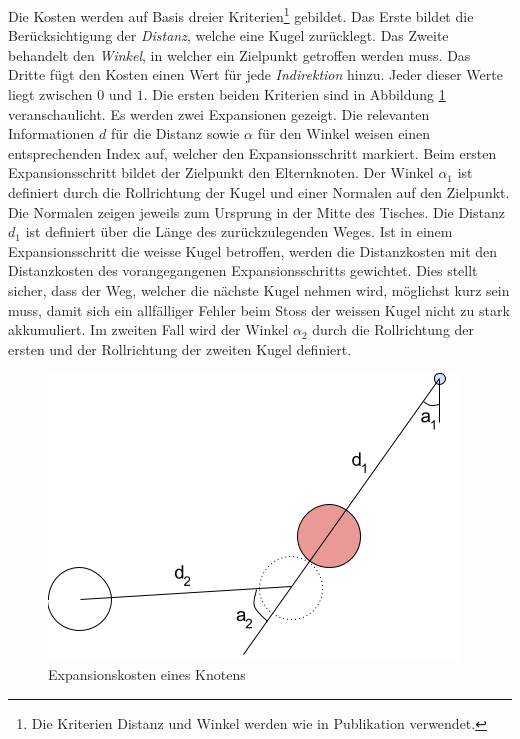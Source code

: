 Die Kosten werden auf Basis dreier Kriterien\footnote{Die Kriterien Distanz und Winkel werden wie
in Publikation \cite{inproceedings:billiard_ai:1} verwendet.} gebildet. Das Erste bildet die Berücksichtigung der \emph{Distanz}, welche eine
Kugel zurücklegt. Das Zweite behandelt den \emph{Winkel}, in welcher ein Zielpunkt getroffen werden muss. Das Dritte fügt den
Kosten einen Wert für jede \emph{Indirektion} hinzu. Jeder dieser Werte liegt zwischen $0$ und $1$.
Die ersten beiden Kriterien sind in Abbildung \ref{fig:suche_knoten_expansionskosten} veranschaulicht.
Es werden zwei Expansionen gezeigt. Die relevanten Informationen $d$ für die Distanz sowie $\alpha$ für den Winkel weisen
einen entsprechenden Index auf, welcher den Expansionsschritt markiert. Beim ersten Expansionsschritt bildet der Zielpunkt
den Elternknoten. Der Winkel $\alpha_1$ ist definiert durch die Rollrichtung der Kugel und einer Normalen auf den Zielpunkt.
Die Normalen zeigen jeweils zum Ursprung in der Mitte des Tisches. Die Distanz $d_1$ ist definiert über die Länge des
zurückzulegenden Weges. Ist in einem Expansionsschritt die weisse Kugel betroffen, werden die Distanzkosten mit den
Distanzkosten des vorangegangenen Expansionsschritts gewichtet. Dies stellt sicher, dass der Weg, welcher die nächste
Kugel nehmen wird, möglichst kurz sein muss, damit sich ein allfälliger Fehler beim Stoss der weissen Kugel nicht zu
stark akkumuliert. Im zweiten Fall wird der Winkel $\alpha_2$ durch die Rollrichtung der ersten und der Rollrichtung
der zweiten Kugel definiert.

\begin{figure}[h!]
    \begin{center}
        \includegraphics[width=0.4\linewidth]{../common/03_billiard_ai/resources/29_suchbaum_expansionskosten.png}
    \end{center}
    \caption{Expansionskosten eines Knotens}
    \label{fig:suche_knoten_expansionskosten}
\end{figure}

